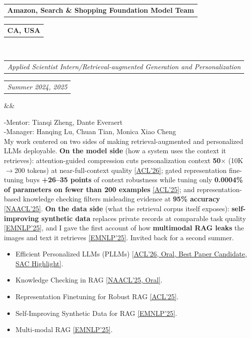 \documentclass[11pt,a4paper,roman]{moderncv}        %
\makeatletter
\newcommand*{\customcventry}[7][.25em]{
  \begin{tabular}{@{}l} 
    {\bfseries #4}
  \end{tabular}
  \hfill%
  \begin{tabular}{l@{}}
     {\bfseries #5}
  \end{tabular} \\
  \begin{tabular}{@{}l} 
    {\itshape #3}
  \end{tabular}
  \hfill%
  \begin{tabular}{l@{}}
     {\itshape #2}
  \end{tabular}
  \ifx&#7&%
  \else{\\%
    \begin{minipage}{\maincolumnwidth}%
      \small#7%
    \end{minipage}}\fi%
  \par\addvspace{#1}}
\makeatother
\begin{document}
{\customcventry{Summer 2024, 2025}{Applied Scientist Intern/Retrieval-augmented Generation and Personalization}{Amazon, Search \& Shopping Foundation Model Team}{CA, USA}{}{}
-Mentor: Tianqi Zheng, Dante Everaert \\
-Manager: Hanqing Lu, Chuan Tian, Monica Xiao Cheng
\\[0.4em]
My work centered on two sides of making retrieval-augmented and personalized LLMs deployable. \textbf{On the model side} (how a system uses the context it retrieves): attention-guided compression cuts personalization context \textbf{50$\times$} (10K$\rightarrow$200 tokens) at near-full-context quality \href{https://arxiv.org/abs/2602.07778}{[ACL'26]}; gated representation fine-tuning buys \textbf{+26--35 points} of context robustness while tuning only \textbf{0.0004\% of parameters on fewer than 200 examples} \href{https://arxiv.org/abs/2502.14100}{[ACL'25]}; and representation-based knowledge checking filters misleading evidence at \textbf{95\% accuracy} \href{https://arxiv.org/abs/2411.14572}{[NAACL'25]}. \textbf{On the data side} (what the retrieval corpus itself exposes): \textbf{self-improving synthetic data} replaces private records at comparable task quality \href{https://arxiv.org/abs/2406.14773}{[EMNLP'25]}, and I gave the first account of how \textbf{multimodal RAG leaks} the images and text it retrieves \href{https://arxiv.org/abs/2505.13957}{[EMNLP'25]}. Invited back for a second summer.
\begin{itemize}
    \item Efficient Personalized LLMs (PLLMs) \href{https://arxiv.org/abs/2602.07778}{[ACL'26, Oral, Best Paper Candidate, SAC Highlight]}.
    \item Knowledge Checking in RAG \href{https://arxiv.org/abs/2411.14572}{[NAACL'25, Oral]}.
    \item Representation Finetuning for Robust RAG \href{https://arxiv.org/abs/2502.14100}{[ACL'25]}.
    \item Self-Improving Synthetic Data for RAG \href{https://arxiv.org/abs/2406.14773}{[EMNLP'25]}.
    \item Multi-modal RAG \href{https://arxiv.org/abs/2505.13957}{[EMNLP'25]}.
\end{itemize}
}
\end{document}
